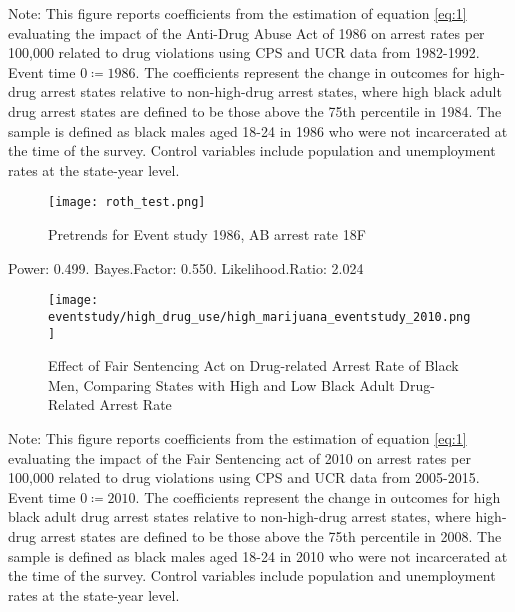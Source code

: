   \begin{footnotesize}
    \noindent Note: This figure reports coefficients from the estimation of equation \ref{eq:1} evaluating the impact of the Anti-Drug Abuse Act of 1986 on arrest rates per 100,000 related to drug violations using CPS and UCR data from 1982-1992. Event time $0 \coloneqq 1986$. The coefficients represent the change in outcomes for high-drug arrest states relative to non-high-drug arrest states, where high black adult drug arrest states are defined to be those above the 75th percentile in 1984. The sample is defined as black males aged 18-24 in 1986 who were not incarcerated at the time of the survey. Control variables include population and unemployment rates at the state-year level. 
  \end{footnotesize}
  
  \clearpage
  
  \begin{figure*}[h]
    \caption{Pretrends for Event study 1986, AB arrest rate 18F}
    \texttt{[image: roth\_test.png]}
  \end{figure*}
  
  Power: 0.499. Bayes.Factor: 0.550.  Likelihood.Ratio: 2.024
  
  \clearpage
  
  \begin{figure}[h]
    \caption{Effect of Fair Sentencing Act on Drug-related Arrest Rate of Black Men, Comparing States with High and Low Black Adult Drug-Related Arrest Rate}
    \centering
    \texttt{[image: eventstudy/high\_drug\_use/high\_marijuana\_eventstudy\_2010.png]}
    \label{fig:ab_es_2010}
  \end{figure}
  
  \begin{footnotesize}
    \noindent Note: This figure reports coefficients from the estimation of equation \ref{eq:1} evaluating the impact of the Fair Sentencing act of 2010 on arrest rates per 100,000 related to drug violations using CPS and UCR data from 2005-2015. Event time $0 \coloneqq 2010$. The coefficients represent the change in outcomes for high black adult drug arrest states relative to non-high-drug arrest states, where high-drug arrest states are defined to be those above the 75th percentile in 2008. The sample is defined as black males aged 18-24 in 2010 who were not incarcerated at the time of the survey. Control variables include population and unemployment rates at the state-year level. 
  \end{footnotesize}

